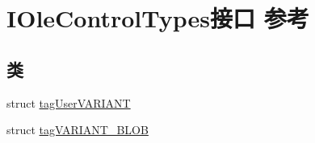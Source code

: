 \hypertarget{interface_i_ole_control_types}{}\section{I\+Ole\+Control\+Types接口 参考}
\label{interface_i_ole_control_types}
\subsection*{类}
\begin{DoxyCompactItemize}
\item 
struct \hyperlink{struct_i_ole_control_types_1_1tag_user_v_a_r_i_a_n_t}{tag\+User\+V\+A\+R\+I\+A\+NT}
\item 
struct \hyperlink{struct_i_ole_control_types_1_1tag_v_a_r_i_a_n_t___b_l_o_b}{tag\+V\+A\+R\+I\+A\+N\+T\+\_\+\+B\+L\+OB}
\end{DoxyCompactItemize}
